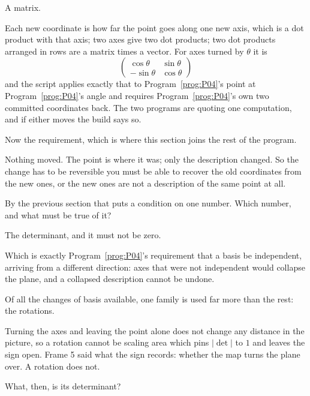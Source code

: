 \begin{fr}
\begin{ansblock}
A matrix.
\end{ansblock}

Each new coordinate is how far the point goes along one new axis, which is a
dot product with that axis; two axes give two dot products; two dot products
arranged in rows are a matrix times a vector. For axes turned by $\theta$ it is
\[ \begin{pmatrix} \cos\theta & \sin\theta \\
                   -\sin\theta & \cos\theta \end{pmatrix} \]
and the script applies exactly that to Program~\ref{prog:P04}'s point at
Program~\ref{prog:P04}'s angle and requires Program~\ref{prog:P04}'s own two
committed coordinates back. The two programs are quoting one computation, and
if either moves the build says so.
\end{fr}

\begin{fr}
Now the requirement, which is where this section joins the rest of the program.

Nothing moved. The point is where it was; only the description changed. So the
change has to be reversible \dash{} you must be able to recover the old
coordinates from the new ones, or the new ones are not a description of the
same point at all.

By the previous section that puts a condition on one number. Which number, and
what must be true of it?
\dotline
\nextframe
\end{fr}

\begin{fr}
\begin{ansblock}
The determinant, and it must not be zero.
\end{ansblock}

Which is exactly Program~\ref{prog:P04}'s requirement that a basis be
independent, arriving from a different direction: axes that were not
independent would collapse the plane, and a collapsed description cannot be
undone.

Of all the changes of basis available, one family is used far more than the
rest: the rotations.

Turning the axes and leaving the point alone does not change any distance in
the picture, so a rotation cannot be scaling area \dash{} which pins
$\lvert\det\rvert$ to $1$ and leaves the sign open. Frame 5 said what the sign
records: whether the map turns the plane over. A rotation does not.

What, then, is its determinant?
\dotline
\nextframe
\end{fr}

